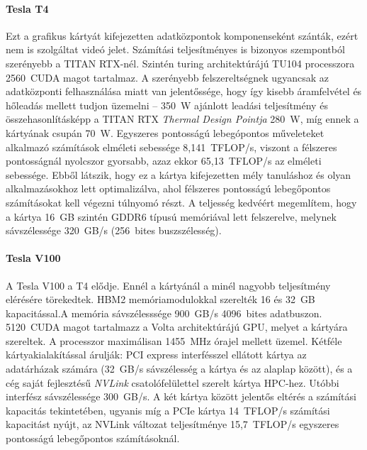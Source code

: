 \paragraph{Tesla T4}
Ezt a grafikus kártyát kifejezetten adatközpontok komponenseként szánták, ezért nem is szolgáltat videó jelet. Számítási teljesítményes is bizonyos szempontból szerényebb a TITAN RTX-nél. Szintén turing architektúrájú TU104 processzora 2560~CUDA magot tartalmaz. A szerényebb felszereltségnek ugyancsak az adatközponti felhasználása miatt van jelentőssége, hogy így kisebb áramfelvétel és hőleadás mellett tudjon üzemelni -- 350~W ajánlott leadási teljesítmény és összehasonlításképp a TITAN RTX \emph{Thermal Design Pointja} 280~W, míg ennek a kártyának csupán 70~W. Egyszeres pontosságú lebegópontos műveleteket alkalmazó számítások elméleti sebessége 8,141~TFLOP/s, viszont a félszeres pontosságnál nyolcszor gyorsabb, azaz ekkor 65,13~TFLOP/s az elméleti sebessége. Ebből látszik, hogy ez a kártya kifejezetten mély tanuláshoz és olyan alkalmazásokhoz lett optimalizálva, ahol félszeres pontosságú lebegőpontos számításokat kell végezni túlnyomó részt. A teljesség kedvéért megemlítem, hogy a kártya 16~GB szintén GDDR6 típusú memóriával lett felszerelve, melynek sávszélessége 320~GB/s (256~bites buszszélesség).

\paragraph{Tesla V100}
A Tesla V100 a T4 elődje. Ennél a kártyánál a minél nagyobb teljesítmény elérésére törekedtek. HBM2 memóriamodulokkal szerelték 16 és 32~GB kapacitással.A memória sávszélesssége 900~GB/s 4096~bites adatbuszon. 5120~CUDA magot tartalmazz a Volta architektúrájú GPU, melyet a kártyára szereltek. A processzor maximálisan 1455~MHz órajel mellett üzemel. Kétféle kártyakialakítással árulják: PCI express interfésszel ellátott kártya az adatárházak számára (32~GB/s sávszélesség a kártya és az alaplap között), és a cég saját fejlesztésű \emph{NVLink} csatolófelülettel szerelt kártya HPC-hez. Utóbbi interfész sávszélessége 300~GB/s. A két kártya között jelentős eltérés a számítási kapacitás tekintetében, ugyanis míg a PCIe kártya 14~TFLOP/s számítási kapacitást nyújt, az NVLink változat teljesítménye 15,7~TFLOP/s egyszeres pontosságú lebegőpontos számításoknál.


